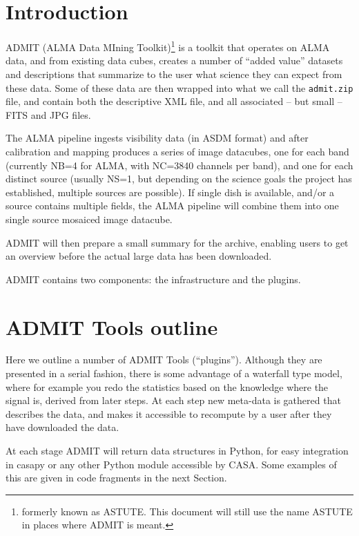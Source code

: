 \documentclass[preprint]{aastex} %
\begin{document}
\section{Introduction}

ADMIT (ALMA Data MIning Toolkit)\footnote{formerly known as ASTUTE. 
This document will still use the name ASTUTE in places where ADMIT is meant.}
is a toolkit that operates on ALMA data, and from existing data cubes, 
creates a number of ``added value'' datasets and descriptions 
that summarize to the user
what science they can expect from these data. Some of these data
are then wrapped into what
we call the {\tt admit.zip} file, and contain both the descriptive XML
file, and all associated -- but small -- FITS and JPG files.

The ALMA pipeline ingests visibility data (in ASDM format) and after calibration
and mapping produces a series of image datacubes, one for each band (currently 
NB=4 for ALMA, with NC=3840 channels per band), and one for each distinct
source (usually NS=1, but depending on the science 
goals the project has established, multiple sources are possible). If
single dish is available, and/or a source contains multiple fields,
the ALMA pipeline will combine them into one single source 
mosaiced image datacube.

ADMIT will then prepare a small summary for the archive, enabling users
to get an overview before the actual large data has been downloaded.

ADMIT contains two components: the infrastructure and the plugins.


\section{ADMIT Tools outline}

\label{s:tools}

Here we outline a number of ADMIT Tools (``plugins'').  Although they
are presented in a serial fashion, there is some advantage of a
waterfall type model, where for example you redo the statistics based
on the knowledge where the signal is, derived from later steps. At
each step new meta-data is gathered that describes the data, and makes
it accessible to recompute by a user after they have downloaded the
data.

At each stage ADMIT will return data structures in Python, for easy
integration in casapy or any other Python module accessible by
CASA. Some examples of this are given in code fragments in the next
Section.
\end{document}
